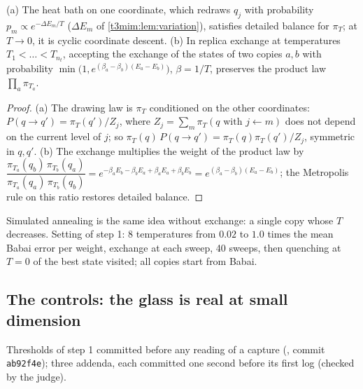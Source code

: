 \begin{proposition}\label{t3mim:prop:gibbs}
(a) The heat bath on one coordinate, which redraws $q_j$ with probability $p_m \propto e^{-\Delta E_m/T}$ ($\Delta E_m$ of \cref{t3mim:lem:variation}), satisfies detailed balance for $\pi_T$; at $T \to 0$, it is cyclic coordinate descent. (b) In replica exchange at temperatures $T_1 < \dots < T_{n_t}$, accepting the exchange of the states of two copies $a, b$ with probability $\min\bigl(1, e^{(\beta_a - \beta_b)(E_a - E_b)}\bigr)$, $\beta = 1/T$, preserves the product law $\prod_a \pi_{T_a}$.
\end{proposition}
\begin{proof}
(a) The drawing law is $\pi_T$ conditioned on the other coordinates: $P(q \to q') = \pi_T(q') / Z_j$, where $Z_j = \sum_m \pi_T(q \text{ with } j \leftarrow m)$ does not depend on the current level of $j$; so $\pi_T(q)\,P(q \to q') = \pi_T(q)\pi_T(q')/Z_j$, symmetric in $q, q'$. (b) The exchange multiplies the weight of the product law by $\dfrac{\pi_{T_a}(q_b)\,\pi_{T_b}(q_a)}{\pi_{T_a}(q_a)\,\pi_{T_b}(q_b)} = e^{-\beta_a E_b - \beta_b E_a + \beta_a E_a + \beta_b E_b} = e^{(\beta_a - \beta_b)(E_a - E_b)}$; the Metropolis rule on this ratio restores detailed balance.
\end{proof}
Simulated annealing is the same idea without exchange: a single copy whose $T$ decreases. Setting of step 1: 8 temperatures from $0.02$ to $1.0$ times the mean Babai error per weight, exchange at each sweep, 40 sweeps, then quenching at $T = 0$ of the best state visited; all copies start from Babai.

\subsection{The controls: the glass is real at small dimension}\label{t3mim:sec:p5-temoins}

Thresholds of step 1 committed before any reading of a capture (, commit \texttt{ab92f4e}); three addenda, each committed one second before its first log (checked by the judge).

